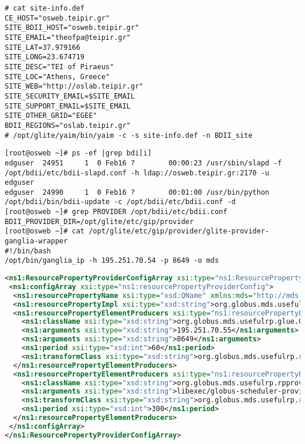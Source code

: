 \begin{lstlisting}[caption=Site Information Definition file,label=siteinfo]
# cat site-info.def
CE_HOST="osweb.teipir.gr"
SITE_BDII_HOST="osweb.teipir.gr"
SITE_EMAIL="theofpa@teipir.gr"
SITE_LAT=37.979166
SITE_LONG=23.674719
SITE_DESC="TEI of Piraeus"
SITE_LOC="Athens, Greece"
SITE_WEB="http://oslab.teipir.gr"
SITE_SECURITY_EMAIL=$SITE_EMAIL
SITE_SUPPORT_EMAIL=$SITE_EMAIL
SITE_OTHER_GRID="EGEE"
BDII_REGIONS="oslab.teipir.gr"
# /opt/glite/yaim/bin/yaim -c -s site-info.def -n BDII_site
\end{lstlisting}

\begin{lstlisting}[caption=Ldap Process running as BDII daemon,label=slapd]
[root@osweb ~]# ps -ef |grep bdi[i]
edguser  24951     1  0 Feb16 ?        00:00:23 /usr/sbin/slapd -f /opt/bdii/etc/bdii-slapd.conf -h ldap://osweb.teipir.gr:2170 -u edguser
edguser  24990     1  0 Feb16 ?        00:01:00 /usr/bin/python /opt/bdii/bin/bdii-update -c /opt/bdii/etc/bdii.conf -d
[root@osweb ~]# grep PROVIDER /opt/bdii/etc/bdii.conf
BDII_PROVIDER_DIR=/opt/glite/etc/gip/provider
[root@osweb ~]# cat /opt/glite/etc/gip/provider/glite-provider-ganglia-wrapper
#!/bin/bash
/opt/bin/ganglia_ip -h 195.251.70.54 -p 8649 -o mds
\end{lstlisting}

\begin{lstlisting}[language=XML,caption=Ganglia Resource Provider for WSRF Index,label=wsrfrp]
<ns1:ResourcePropertyProviderConfigArray xsi:type="ns1:ResourcePropertyProviderConfigArray" xmlns:ns1="http://mds.globus.org/rpprovider/2005/08" xmlns:xsi="http://www.w3.org/2001/XMLSchema-instance">
 <ns1:configArray xsi:type="ns1:resourcePropertyProviderConfig">
  <ns1:resourcePropertyName xsi:type="xsd:QName" xmlns:mds="http://mds.globus.org/glue/ce/1.1">mds:GLUECE</ns1:resourcePropertyName>
  <ns1:resourcePropertyImpl xsi:type="xsd:string">org.globus.mds.usefulrp.rpprovider.GLUEResourceProperty</ns1:resourcePropertyImpl>
  <ns1:resourcePropertyElementProducers xsi:type="ns1:resourcePropertyElementProducerConfig">
    <ns1:className xsi:type="xsd:string">org.globus.mds.usefulrp.glue.GangliaElementProducer</ns1:className>
    <ns1:arguments xsi:type="xsd:string">195.251.70.55</ns1:arguments>
    <ns1:arguments xsi:type="xsd:string">8649</ns1:arguments>
    <ns1:period xsi:type="xsd:int">60</ns1:period>
    <ns1:transformClass xsi:type="xsd:string">org.globus.mds.usefulrp.rpprovider.transforms.GLUEComputeElementTransform</ns1:transformClass>
  </ns1:resourcePropertyElementProducers>
  <ns1:resourcePropertyElementProducers xsi:type="ns1:resourcePropertyElementProducerConfig">
    <ns1:className xsi:type="xsd:string">org.globus.mds.usefulrp.rpprovider.producers.SchedulerInfoElementProducer</ns1:className>
    <ns1:arguments xsi:type="xsd:string">libexec/globus-scheduler-provider-fork</ns1:arguments>
    <ns1:transformClass xsi:type="xsd:string">org.globus.mds.usefulrp.rpprovider.transforms.GLUESchedulerElementTransform</ns1:transformClass>
    <ns1:period xsi:type="xsd:int">300</ns1:period>
  </ns1:resourcePropertyElementProducers>
 </ns1:configArray>
</ns1:ResourcePropertyProviderConfigArray>
\end{lstlisting}

